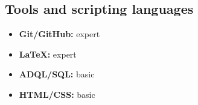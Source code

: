 \documentclass[12pt, letterpaper]{hunt-cv}
\begin{document}
\subsection*{Tools and scripting languages}

\begin{itemize}
    \item \textbf{Git/GitHub:} expert
    \item \textbf{LaTeX:} expert
    \item \textbf{ADQL/SQL:} basic
    \item \textbf{HTML/CSS:} basic
\end{itemize}
\end{document}
